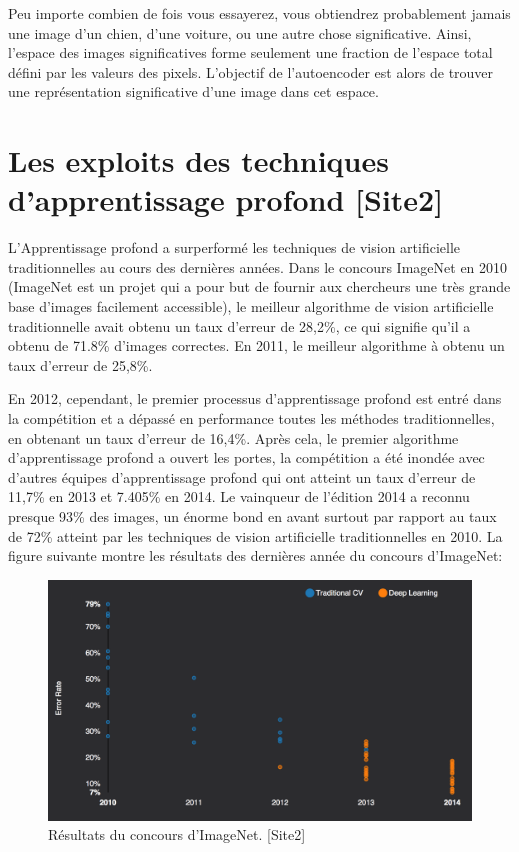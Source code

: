 	Peu importe combien de fois vous essayerez, vous obtiendrez probablement jamais une image d'un chien, d'une voiture, ou une autre chose significative.
Ainsi, l'espace des images significatives forme seulement une fraction de l'espace total défini par les valeurs des pixels. L'objectif de l'autoencoder est alors de trouver une représentation significative d'une image dans cet espace.

\section{Les exploits des techniques d'apprentissage profond [Site2]}

	L'Apprentissage profond a surperformé les techniques de vision artificielle traditionnelles au cours des dernières années. Dans le concours ImageNet en 2010 (ImageNet est un projet qui a pour but de fournir aux chercheurs une très grande base d'images facilement accessible), le meilleur algorithme de vision artificielle traditionnelle avait obtenu un taux d'erreur de 28,2\%, ce qui signifie qu'il a obtenu de 71.8\% d'images correctes. En 2011, le meilleur algorithme à obtenu un taux d'erreur de 25,8\%. 

	En 2012, cependant, le premier processus d'apprentissage profond est entré dans la compétition et a dépassé en performance toutes les méthodes traditionnelles, en obtenant un taux d'erreur de 16,4\%.
	Après cela, le premier algorithme d'apprentissage profond a ouvert les portes, la compétition a été inondée avec d'autres équipes d'apprentissage profond qui ont atteint un taux d'erreur de 11,7\% en 2013 et 7.405\% en 2014. Le vainqueur de l'édition 2014 a reconnu presque 93\% des images, un énorme bond en avant surtout par rapport au taux de 72\% atteint par les techniques de vision artificielle traditionnelles en 2010. La figure suivante montre les résultats des dernières année du concours d'ImageNet:

\begin{figure}[H]
	\centering
		\includegraphics[width=5in]{Figures/clairifaiIMAGENET.png}
	\caption[An Electron]{Résultats du concours d'ImageNet. [Site2]}
	\label{fig:Electron}
\end{figure}


